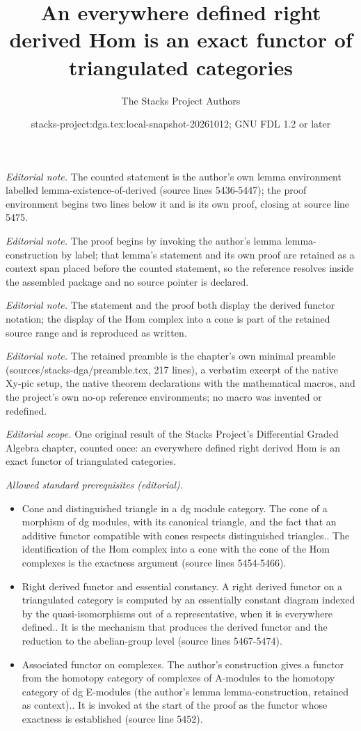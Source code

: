 \documentclass{stacks-project}
\title{An everywhere defined right derived Hom is an exact functor of triangulated categories}
\author{The Stacks Project Authors}
\date{stacks-project:dga.tex:local-snapshot-20261012; GNU FDL 1.2 or later}
\theoremstyle{plain}
\theoremstyle{definition}
\theoremstyle{remark}
\numberwithin{equation}{subsection}
\begin{document}
\maketitle
\noindent\textit{Editorial note.} The counted statement is the author's own lemma environment labelled lemma-existence-of-derived (source lines 5436-5447); the proof environment begins two lines below it and is its own proof, closing at source line 5475.\par\medskip
\noindent\textit{Editorial note.} The proof begins by invoking the author's lemma lemma-construction by label; that lemma's statement and its own proof are retained as a context span placed before the counted statement, so the reference resolves inside the assembled package and no source pointer is declared.\par\medskip
\noindent\textit{Editorial note.} The statement and the proof both display the derived functor notation; the display of the Hom complex into a cone is part of the retained source range and is reproduced as written.\par\medskip
\noindent\textit{Editorial note.} The retained preamble is the chapter's own minimal preamble (sources/stacks-dga/preamble.tex, 217 lines), a verbatim excerpt of the native Xy-pic setup, the native theorem declarations with the mathematical macros, and the project's own no-op reference environments; no macro was invented or redefined.\par\medskip
\noindent\textit{Editorial scope.} One original result of the Stacks Project's Differential Graded Algebra chapter, counted once: an everywhere defined right derived Hom is an exact functor of triangulated categories.\par\medskip
\noindent\textit{Allowed standard prerequisites (editorial).}\begin{itemize}
\item Cone and distinguished triangle in a dg module category. The cone of a morphism of dg modules, with its canonical triangle, and the fact that an additive functor compatible with cones respects distinguished triangles.. The identification of the Hom complex into a cone with the cone of the Hom complexes is the exactness argument (source lines 5454-5466).
\item Right derived functor and essential constancy. A right derived functor on a triangulated category is computed by an essentially constant diagram indexed by the quasi-isomorphisms out of a representative, when it is everywhere defined.. It is the mechanism that produces the derived functor and the reduction to the abelian-group level (source lines 5467-5474).
\item Associated functor on complexes. The author's construction gives a functor from the homotopy category of complexes of A-modules to the homotopy category of dg E-modules (the author's lemma lemma-construction, retained as context).. It is invoked at the start of the proof as the functor whose exactness is established (source line 5452).
\end{itemize}\medskip
\end{document}
